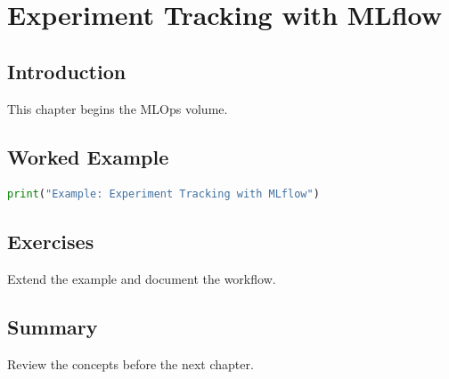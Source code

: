 \chapter{Experiment Tracking with MLflow}
\label{chap:vol10-2}



\section{Introduction}
This chapter begins the MLOps volume.

\section{Worked Example}
\begin{lstlisting}[language=Python]
print("Example: Experiment Tracking with MLflow")
\end{lstlisting}

\section{Exercises}
\begin{exercise}
Extend the example and document the workflow.
\end{exercise}

\section{Summary}
Review the concepts before the next chapter.
